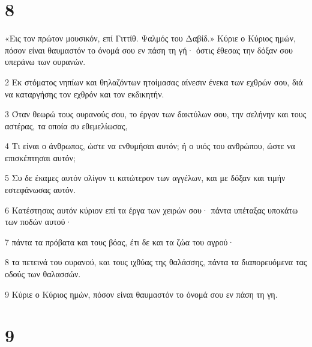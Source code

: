\chapter{8}

\par «Εις τον πρώτον μουσικόν, επί Γιττίθ. Ψαλμός του Δαβίδ.» Κύριε ο Κύριος ημών, πόσον είναι θαυμαστόν το όνομά σου εν πάση τη γή· όστις έθεσας την δόξαν σου υπεράνω των ουρανών.
\par 2 Εκ στόματος νηπίων και θηλαζόντων ητοίμασας αίνεσιν ένεκα των εχθρών σου, διά να καταργήσης τον εχθρόν και τον εκδικητήν.
\par 3 Όταν θεωρώ τους ουρανούς σου, το έργον των δακτύλων σου, την σελήνην και τους αστέρας, τα οποία συ εθεμελίωσας,
\par 4 Τι είναι ο άνθρωπος, ώστε να ενθυμήσαι αυτόν; ή ο υιός του ανθρώπου, ώστε να επισκέπτησαι αυτόν;
\par 5 Συ δε έκαμες αυτόν ολίγον τι κατώτερον των αγγέλων, και με δόξαν και τιμήν εστεφάνωσας αυτόν.
\par 6 Κατέστησας αυτόν κύριον επί τα έργα των χειρών σου· πάντα υπέταξας υποκάτω των ποδών αυτού·
\par 7 πάντα τα πρόβατα και τους βόας, έτι δε και τα ζώα του αγρού·
\par 8 τα πετεινά του ουρανού, και τους ιχθύας της θαλάσσης, πάντα τα διαπορευόμενα τας οδούς των θαλασσών.
\par 9 Κύριε ο Κύριος ημών, πόσον είναι θαυμαστόν το όνομά σου εν πάση τη γη.

\chapter{9}


